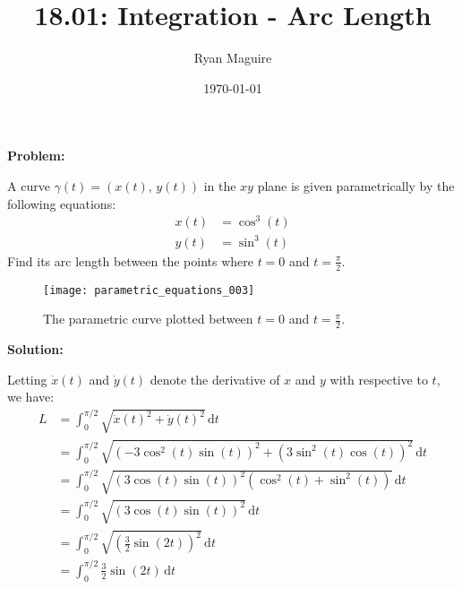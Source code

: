 \documentclass{article}
\title{18.01: Integration - Arc Length}
\author{Ryan Maguire}
\date{\today}
\newif\ifsolution
\begin{document}
    \maketitle
    \textbf{Problem:}
    \par\hfill\par
    A curve $\gamma(t)=\left(x(t),\,y(t)\right)$
    in the $xy$ plane is given parametrically by the following equations:
    \begin{subequations}
        \begin{align}
            x(t)&=\cos^{3}(t)\\
            y(t)&=\sin^{3}(t)
        \end{align}
    \end{subequations}
    Find its arc length between the points where $t=0$ and $t=\frac{\pi}{2}$.
    \begin{figure}[H]
        \centering
        \texttt{[image: parametric\_equations\_003]}
        \caption{%
            The parametric curve plotted between
            $t=0$ and $t=\frac{\pi}{2}$.%
        }
    \end{figure}
    \ifsolution
        \par\hfill\par
        \color{blue}
        \textbf{Solution:}
        \par\hfill\par
        Letting $\dot{x}(t)$ and $\dot{y}(t)$ denote the derivative of
        $x$ and $y$ with respective to $t$, we have:
        \begin{subequations}
            \begin{align}
                L&=\int_{0}^{\pi/2}
                    \sqrt{\dot{x}(t)^{2}+\dot{y}(t)^{2}}\,\textrm{d}t\\
                &=\int_{0}^{\pi/2}
                    \sqrt{
                        \left(-3\cos^{2}(t)\sin(t)\right)^{2}
                        +\left(3\sin^{2}(t)\cos(t)\right)^{2}
                    }\,\textrm{d}t\\
                &=\int_{0}^{\pi/2}
                    \sqrt{
                        \left(3\cos(t)\sin(t)\right)^{2}
                        \left(\cos^{2}(t)+\sin^{2}(t)\right)
                    }\,\textrm{d}t\\
                &=\int_{0}^{\pi/2}
                    \sqrt{\left(3\cos(t)\sin(t)\right)^{2}}\,\textrm{d}t\\
                &=\int_{0}^{\pi/2}
                    \sqrt{\left(\frac{3}{2}\sin(2t)\right)^{2}}\,\textrm{d}t\\
                &=\int_{0}^{\pi/2}\frac{3}{2}\sin(2t)\,\textrm{d}t
            \end{align}
        \end{subequations}
\end{document}
